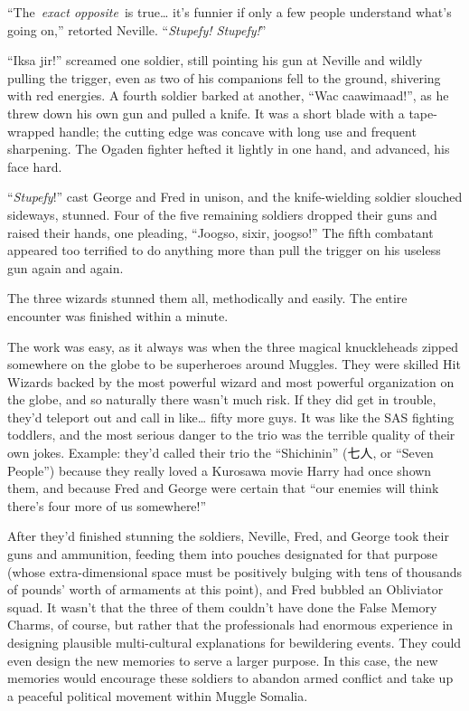 ``The~\emph{exact opposite}~is true\ldots{} it's funnier if only a few
people understand what's going on,'' retorted Neville. ``\emph{Stupefy!
Stupefy!}''

``Iksa jir!'' screamed one soldier, still pointing his gun at Neville
and wildly pulling the trigger, even as two of his companions fell to
the ground, shivering with red energies. A fourth soldier barked at
another, ``Wac caawimaad!'', as he threw down his own gun and pulled a
knife. It was a short blade with a tape-wrapped handle; the cutting edge
was concave with long use and frequent sharpening. The Ogaden fighter
hefted it lightly in one hand, and advanced, his face hard.

``\emph{Stupefy}!'' cast George and Fred in unison, and the
knife-wielding soldier slouched sideways, stunned. Four of the five
remaining soldiers dropped their guns and raised their hands, one
pleading, ``Joogso, sixir, joogso!'' The fifth combatant appeared too
terrified to do anything more than pull the trigger on his useless gun
again and again.

The three wizards stunned them all, methodically and easily. The entire
encounter was finished within a minute.

The work was easy, as it always was when the three magical knuckleheads
zipped somewhere on the globe to be superheroes around Muggles. They
were skilled Hit Wizards backed by the most powerful wizard and most
powerful organization on the globe, and so naturally there wasn't much
risk. If they did get in trouble, they'd teleport out and call in
like\ldots{} fifty more guys. It was like the SAS fighting toddlers, and
the most serious danger to the trio was the terrible quality of their
own jokes. Example: they'd called their trio the ``Shichinin''
(\foreignlanguage{japanese}{七人}, or ``Seven People'') because they really
loved a Kurosawa movie Harry had once shown them, and because Fred and
George were certain that ``our enemies will think there's four more of
us somewhere!''

After they'd finished stunning the soldiers, Neville, Fred, and George
took their guns and ammunition, feeding them into pouches designated for
that purpose (whose extra-dimensional space must be positively bulging
with tens of thousands of pounds' worth of armaments at this point), and
Fred bubbled an Obliviator squad. It wasn't that the three of them
couldn't have done the False Memory Charms, of course, but rather that
the professionals had enormous experience in designing plausible
multi-cultural explanations for bewildering events. They could even
design the new memories to serve a larger purpose. In this case, the new
memories would encourage these soldiers to abandon armed conflict and
take up a peaceful political movement within Muggle Somalia.

